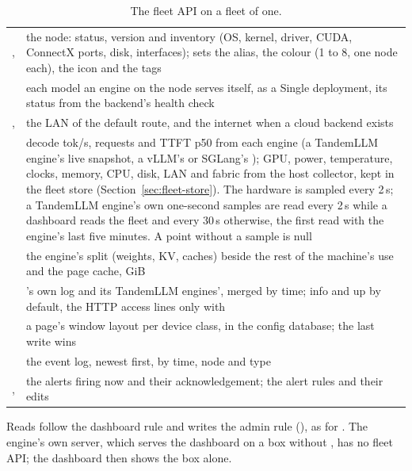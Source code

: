 \begin{table}[htbp]
\centering\small
\caption{The fleet API on a fleet of one.}\label{tab:fleet-one}
\begin{tabularx}{\linewidth}{@{}L{.26\linewidth}Y@{}}
\toprule
{} &  \\
\midrule
{},  & the node: status, version and inventory (OS, kernel, driver, CUDA, ConnectX ports, disk, interfaces);  sets the alias, the colour (1 to 8, one node each), the icon and the tags \\
 & each model an engine on the node serves itself, as a Single deployment, its status from the backend's health check \\
,  & the LAN of the default route, and the internet when a cloud backend exists \\
 & decode tok/s, requests and TTFT p50 from each engine (a TandemLLM engine's live snapshot, a vLLM's or SGLang's ); GPU, power, temperature, clocks, memory, CPU, disk, LAN and fabric from the host collector, kept in the fleet store (Section~\ref{sec:fleet-store}). The hardware is sampled every 2\,s; a TandemLLM engine's own one-second samples are read every 2\,s while a dashboard reads the fleet and every 30\,s otherwise, the first read with the engine's last five minutes. A point without a sample is null \\
 & the engine's split (weights, KV, caches) beside the rest of the machine's use and the page cache, GiB \\
 & 's own log and its TandemLLM engines', merged by time; info and up by default, the HTTP access lines only with  \\
 & a page's window layout per device class, in the config database; the last write wins \\
 & the event log, newest first, by time, node and type \\
,  & the alerts firing now and their acknowledgement; the alert rules and their edits \\
\bottomrule
\end{tabularx}
\end{table}

Reads follow the dashboard rule and writes the admin rule (), as for . The engine's own server, which serves the dashboard on a box without , has no fleet API; the dashboard then shows the box alone.

